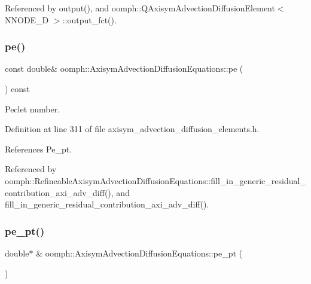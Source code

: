 Referenced by output(), and oomph\+::\+Q\+Axisym\+Advection\+Diffusion\+Element$<$ N\+N\+O\+D\+E\+\_\+D $>$\+::output\+\_\+fct().

\mbox{\label{classoomph_1_1AxisymAdvectionDiffusionEquations_a5fe8ad73aa3e51e071b61aa928f4d49a}} 
\subsubsection{\texorpdfstring{pe()}{pe()}}
{\footnotesize\ttfamily const double\& oomph\+::\+Axisym\+Advection\+Diffusion\+Equations\+::pe (\begin{DoxyParamCaption}{ }\end{DoxyParamCaption}) const\hspace{0.3cm}{\ttfamily [inline]}}



Peclet number. 



Definition at line 311 of file axisym\+\_\+advection\+\_\+diffusion\+\_\+elements.\+h.



References Pe\+\_\+pt.



Referenced by oomph\+::\+Refineable\+Axisym\+Advection\+Diffusion\+Equations\+::fill\+\_\+in\+\_\+generic\+\_\+residual\+\_\+contribution\+\_\+axi\+\_\+adv\+\_\+diff(), and fill\+\_\+in\+\_\+generic\+\_\+residual\+\_\+contribution\+\_\+axi\+\_\+adv\+\_\+diff().

\mbox{\label{classoomph_1_1AxisymAdvectionDiffusionEquations_af993c9e10b06b7f909569db2e9f9459f}} 
\subsubsection{\texorpdfstring{pe\+\_\+pt()}{pe\_pt()}}
{\footnotesize\ttfamily double$\ast$ \& oomph\+::\+Axisym\+Advection\+Diffusion\+Equations\+::pe\+\_\+pt (\begin{DoxyParamCaption}{ }\end{DoxyParamCaption})\hspace{0.3cm}{\ttfamily [inline]}}



